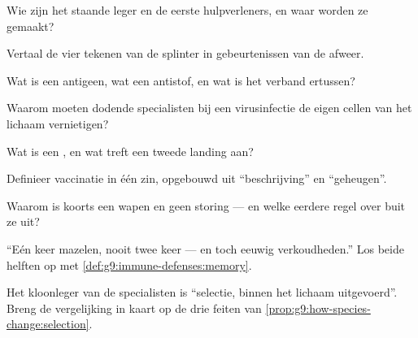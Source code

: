 \begin{exercise}[$\star$]\label{exo:g9:immune-defenses:1}
Wie zijn het staande leger en de eerste hulpverleners, en waar
worden ze gemaakt?
\end{exercise}

\begin{exercise}[$\star$]\label{exo:g9:immune-defenses:2}
Vertaal de vier tekenen van de splinter in gebeurtenissen van de afweer.
\end{exercise}

\begin{exercise}[$\star$]\label{exo:g9:immune-defenses:3}
Wat is een antigeen, wat een antistof, en wat is het verband
ertussen?
\end{exercise}

\begin{exercise}[$\star$]\label{exo:g9:immune-defenses:4}
Waarom moeten dodende specialisten bij een virusinfectie de eigen
cellen van het lichaam vernietigen?
\end{exercise}

\begin{exercise}[$\star$]\label{exo:g9:immune-defenses:5}
Wat is een , en wat treft een tweede landing aan?
\end{exercise}

\begin{exercise}[$\star$]\label{exo:g9:immune-defenses:6}
Definieer vaccinatie in één zin, opgebouwd uit ``beschrijving'' en
``geheugen''.
\end{exercise}

\begin{exercise}[$\star\star$]\label{exo:g9:immune-defenses:7}
Waarom is koorts een wapen en geen storing --- en welke eerdere
regel over  buit ze uit?
\end{exercise}

\begin{exercise}[$\star\star$]\label{exo:g9:immune-defenses:8}
``Eén keer mazelen, nooit twee keer --- en toch eeuwig
verkoudheden.'' Los beide helften op met
\cref{def:g9:immune-defenses:memory}.
\end{exercise}

\begin{exercise}[$\star\star$]\label{exo:g9:immune-defenses:9}
Het kloonleger van de specialisten is ``selectie, binnen het
lichaam uitgevoerd''. Breng de vergelijking in kaart op de drie
feiten van
\cref{prop:g9:how-species-change:selection}.
\end{exercise}


